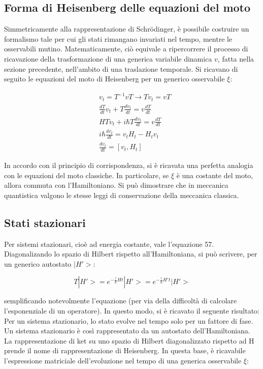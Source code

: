 \documentclass{article}
\begin{document}
\subsection{Forma di Heisenberg delle equazioni del moto}
Simmetricamente alla rappresentazione di Schrödinger, è possibile costruire un formalismo tale per cui gli stati rimangano invariati nel tempo,
mentre le osservabili mutino.
Matematicamente, ciò equivale a ripercorrere il processo di ricavazione della trasformazione di una generica variabile dinamica $v$, fatta nella sezione precedente,
nell'ambito di una traslazione temporale.
Si ricavano di seguito le equazioni del moto di Heisenberg per un generico osservabile $\xi$:

\begin{equation}
    \begin{aligned}
         & v_t=T^{-1}vT \rightarrow Tv_t= vT                 \\
         & \frac{dT}{dt}v_t+T\frac{dv_t}{dt}= v\frac{dT}{dt} \\
         & HTv_t+i\hbar T \frac{d v_t}{dt}=v\frac{dT}{dt}    \\
         & i\hbar \frac{dv_t}{dt}=v_tH_t-H_tv_t              \\
         & \frac{dv_t}{dt}=[v_t, H_t]
    \end{aligned}
\end{equation}

In accordo con il principio di corrispondenza, si è ricavata una perfetta analogia con le equazioni del moto classiche.
In particolare, se $\xi$ è una costante del moto, allora commuta con l'Hamiltoniano.
Si può dimostrare che in meccanica quantistica valgono le stesse leggi di conservazione della meccanica classica.

\subsection{Stati stazionari}
Per sistemi stazionari, cioè ad energia costante, vale l'equazione 57.
Diagonalizando lo spazio di Hilbert rispetto all'Hamiltoniana, si può scrivere, per un generico autostato $|H'>$:

\begin{equation}
    T |H'>= e^{-\frac{i}{\hbar}Ht}|H'>= e^{-\frac{i}{\hbar}H't}|H'>
\end{equation}

semplificando notevolmente l'equazione (per via della difficoltà di calcolare l'esponenziale di un operatore).
In questo modo, si è ricavato il seguente risultato: Per un sistema stazionario, lo stato evolve nel tempo solo per un fattore di fase.
Un sistema stazionario è così rappresentato da un autostato dell'Hamiltoniana.
La rappresentazione di ket su uno spazio di Hilbert diagonalizzato rispetto ad H prende il nome di rappresentazione di Heisenberg.
In questa base, è ricavabile l'espressione matriciale dell'evoluzione nel tempo di una generica osservabile $\xi$:
\end{document}
